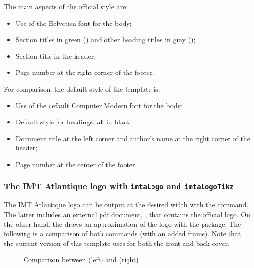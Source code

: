 \documentclass{report}
\begin{document}
\vspace{1em}
The main aspects of the official style are:

\begin{itemize}
    \item Use of the Helvetica font for the body;
    \item Section titles in green () and other heading titles in gray ();
    \item Section title in the header;
    \item Page number at the right corner of the footer.
\end{itemize}

\vspace{1em}
For comparison, the default style of the template is:

\begin{itemize}
    \item Use of the default Computer Modern font for the body;
    \item Default style for headings: all in black;
    \item Document title at the left corner and author's name at the right corner of the header;
    \item Page number at the center of the footer.
\end{itemize}


\subsubsection{The IMT Atlantique logo with \texttt{imtaLogo} and \texttt{imtaLogoTikz}}
The IMT Atlantique logo can be output at the desired width with the  command.
The latter includes an external pdf document, , that contains the official logo.
On the other hand, the  draws an approximation of the logo with the  package.
The following is a comparison of both commands (with an added frame). Note that the current version of this template uses  for both the front and back cover.

\begin{figure}[H]
    \centering
    \fbox{\imtaLogo{5cm}}
    \fbox{\imtaLogoTikz{5cm}}
    \caption{Comparison between  (left) and  (right)}
    \label{fig:imtaLogo}
\end{figure}
\end{document}
